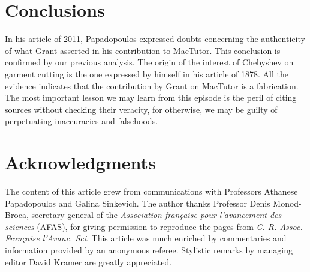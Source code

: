 \documentclass[12pt]{article}
\begin{document}
\section*{Conclusions}

In his article of 2011, Papadopoulos expressed doubts concerning the authenticity of what Grant asserted in his contribution to MacTutor. This conclusion is confirmed by our previous analysis. The origin of the interest of Chebyshev on garment cutting is the one expressed by himself in his article of 1878. All the evidence indicates that the contribution by Grant on MacTutor is a fabrication. The most important lesson we may learn from this episode is the peril of citing sources without checking their veracity, for otherwise, we may be guilty of perpetuating inaccuracies and falsehoods.

\section*{Acknowledgments}

The content of this article grew from communications with Professors Athanese Papadopoulos and Galina Sinkevich. The author thanks Professor Denis Monod-Broca, secretary general of the {\it Association fran\c caise pour l'avancement des sciences} (AFAS), for giving permission to reproduce the pages from {\it C. R. Assoc. Fran\c caise l'Avanc. Sci}. This article was much enriched by commentaries and information provided by an anonymous referee. Stylistic remarks by managing editor David Kramer are greatly appreciated.
\end{document}
